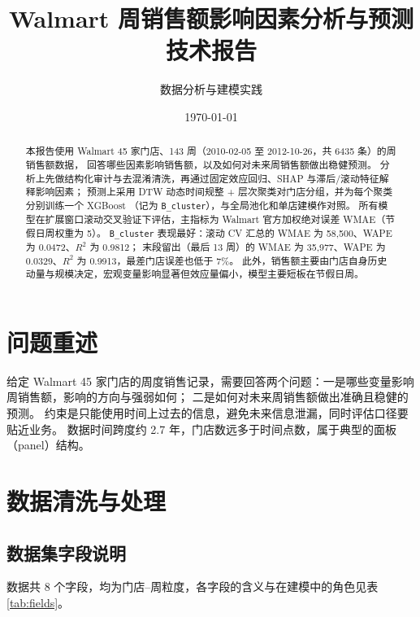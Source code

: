 \documentclass[UTF8,a4paper,11pt]{ctexart}
\title{Walmart 周销售额影响因素分析与预测\\ \large 技术报告}
\author{数据分析与建模实践}
\date{\today}
\begin{document}
\maketitle

\begin{abstract}
\noindent
本报告使用 Walmart 45 家门店、143 周（2010-02-05 至 2012-10-26，共 6435 条）的周销售额数据，
回答哪些因素影响销售额，以及如何对未来周销售额做出稳健预测。
分析上先做结构化审计与去混淆清洗，再通过固定效应回归、SHAP 与滞后/滚动特征解释影响因素；
预测上采用 DTW 动态时间规整 + 层次聚类对门店分组，并为每个聚类分别训练一个 XGBoost
（记为 \texttt{B\_cluster}），与全局池化和单店建模作对照。
所有模型在扩展窗口滚动交叉验证下评估，主指标为 Walmart 官方加权绝对误差 WMAE（节假日周权重为 5）。
\texttt{B\_cluster} 表现最好：滚动 CV 汇总的 WMAE 为 58{,}500、WAPE 为 0.0472、$R^2$ 为 0.9812；
末段留出（最后 13 周）的 WMAE 为 35{,}977、WAPE 为 0.0329、$R^2$ 为 0.9913，最差门店误差也低于 7\%。
此外，销售额主要由门店自身历史动量与规模决定，宏观变量影响显著但效应量偏小，模型主要短板在节假日周。
\end{abstract}

\section{问题重述}

给定 Walmart 45 家门店的周度销售记录，需要回答两个问题：一是哪些变量影响周销售额，影响的方向与强弱如何；
二是如何对未来周销售额做出准确且稳健的预测。
约束是只能使用时间上过去的信息，避免未来信息泄漏，同时评估口径要贴近业务。
数据时间跨度约 2.7 年，门店数远多于时间点数，属于典型的面板（panel）结构。

\section{数据清洗与处理}

\subsection{数据集字段说明}

数据共 8 个字段，均为门店--周粒度，各字段的含义与在建模中的角色见表 \ref{tab:fields}。
\end{document}
